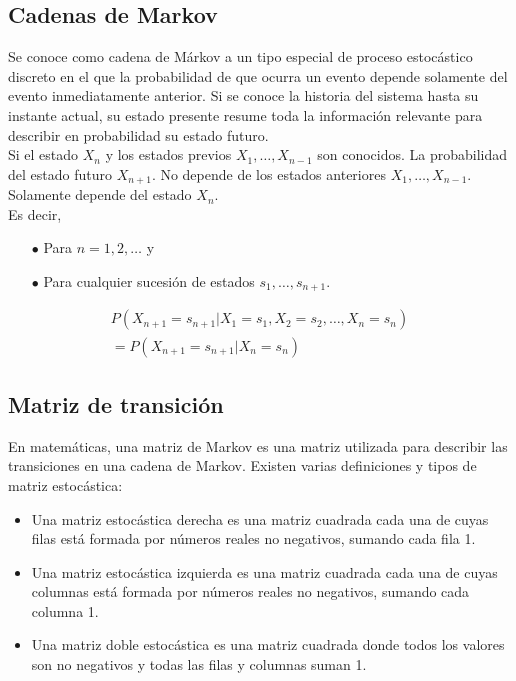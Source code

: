 \subsection{Cadenas de Markov}
Se conoce como cadena de Márkov a un tipo especial de proceso estocástico discreto en el que la probabilidad de que ocurra un evento depende solamente del evento inmediatamente anterior. Si se conoce la historia del sistema hasta su instante actual, su estado presente resume toda la información relevante para describir en probabilidad su estado futuro.\\

Si el estado $X_n$ y los estados previos $X_1, \dots,X_{n-1}$ son conocidos. La probabilidad del estado futuro $X_{n+1}$. No depende de los estados anteriores $X_1,\dots,X_{n-1}$. Solamente depende del estado $X_n$.\\

Es decir,

\begin{itemize}
\item[$\bullet$] Para $n = 1, 2,\dots$ y
\item[$\bullet$] Para cualquier sucesión de estados $s_1,\dots,s_{n+1}$.
\end{itemize}

\begin{multline}
    P(X_{n+1} = s_{n+1} | X_1 = s_1, X_2 = s_2,\dots, X_n = s_n ) \\ =  P(X_{n+1} = s_{n+1} | X_n = s_n)
\end{multline}

\subsection{Matriz de transición}
En matemáticas, una matriz de Markov es una matriz utilizada para describir las transiciones en una cadena de Markov. Existen varias definiciones y tipos de matriz estocástica:

\begin{itemize}
\item Una matriz estocástica derecha es una matriz cuadrada cada una de cuyas filas está formada por números reales no negativos, sumando cada fila 1.
\item Una matriz estocástica izquierda es una matriz cuadrada cada una de cuyas columnas está formada por números reales no negativos, sumando cada columna 1.
\item Una matriz doble estocástica es una matriz cuadrada donde todos los valores son no negativos y todas las filas y columnas suman 1.
\end{itemize}

